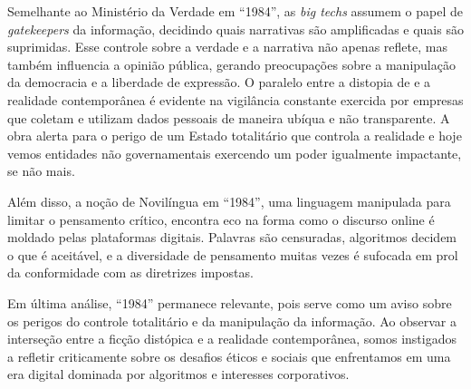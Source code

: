 \documentclass[
	12pt,
	openright,
	twoside,
	a4paper,
	english,
	french,
	spanish,
	brazil
]{abntex2}
\begin{document}
  Semelhante ao Ministério da Verdade em ``1984'', as \textit{big techs} assumem
  o papel de \textit{gatekeepers} da informação, decidindo quais narrativas são
  amplificadas e quais são suprimidas. Esse controle sobre a verdade e a
  narrativa não apenas reflete, mas também influencia a opinião pública, gerando
  preocupações sobre a manipulação da democracia e a liberdade de expressão. O
  paralelo entre a distopia de  e a realidade
  contemporânea é evidente na vigilância constante exercida por empresas que
  coletam e utilizam dados pessoais de maneira ubíqua e não transparente. A obra
  alerta para o perigo de um Estado totalitário que controla a realidade e hoje
  vemos entidades não governamentais exercendo um poder igualmente impactante,
  se não mais.

  Além disso, a noção de Novilíngua em ``1984'', uma linguagem manipulada para
  limitar o pensamento crítico, encontra eco na forma como o discurso online é
  moldado pelas plataformas digitais. Palavras são censuradas, algoritmos
  decidem o que é aceitável, e a diversidade de pensamento muitas vezes é
  sufocada em prol da conformidade com as diretrizes impostas.

  Em última análise, ``1984'' permanece relevante, pois serve como um aviso sobre
  os perigos do controle totalitário e da manipulação da informação. Ao observar
  a interseção entre a ficção distópica e a realidade contemporânea, somos
  instigados a refletir criticamente sobre os desafios éticos e sociais que
  enfrentamos em uma era digital dominada por algoritmos e interesses
  corporativos.

  \postextual

  
\end{document}

